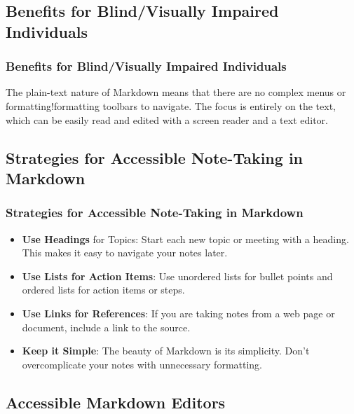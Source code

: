 \subsection{Benefits for Blind/Visually Impaired Individuals}
\label{subsec:notetaking-benefits-vi}
\subsubsection{Benefits for Blind/Visually Impaired Individuals}
\label{ssubsec:notetaking-benefits-vi-details}
The plain-text nature of Markdown means that there are no complex menus or formatting!formatting toolbars to navigate. The focus is entirely on the text, which can be easily read and edited with a screen reader and a text editor.

\subsection{Strategies for Accessible Note-Taking in Markdown}
\label{subsec:accessible-notetaking-strategies}
\subsubsection{Strategies for Accessible Note-Taking in Markdown}
\label{ssubsec:accessible-notetaking-strategies-details}
\begin{itemize}
	\item \textbf{Use Headings} for Topics: Start each new topic or meeting with a heading. This makes it easy to navigate your notes later.
	\item \textbf{Use Lists for Action Items}: Use unordered lists for bullet points and ordered lists for action items or steps.
	\item \textbf{Use Links for References}: If you are taking notes from a web page or document, include a link to the source.
	\item \textbf{Keep it Simple}: The beauty of Markdown is its simplicity. Don't overcomplicate your notes with unnecessary formatting.
\end{itemize}

\subsection{Accessible Markdown Editors}
\label{subsec:accessible-markdown-editors}
